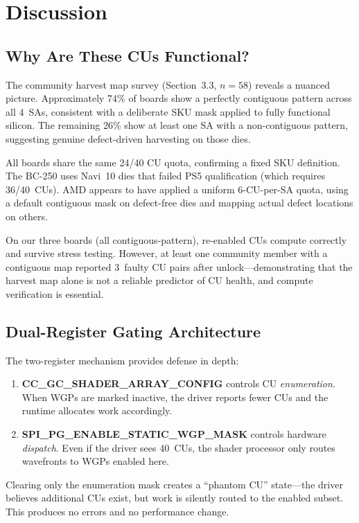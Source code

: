 \documentclass[11pt,twocolumn]{article}
\begin{document}
\section{Discussion}

\subsection{Why Are These CUs Functional?}

The community harvest map survey (Section~3.3, $n=58$) reveals a nuanced picture. Approximately 74\% of boards show a perfectly contiguous pattern across all 4~SAs, consistent with a deliberate SKU mask applied to fully functional silicon. The remaining 26\% show at least one SA with a non-contiguous pattern, suggesting genuine defect-driven harvesting on those dies.

All boards share the same 24/40 CU quota, confirming a fixed SKU definition. The BC-250 uses Navi~10 dies that failed PS5 qualification (which requires 36/40~CUs). AMD appears to have applied a uniform 6-CU-per-SA quota, using a default contiguous mask on defect-free dies and mapping actual defect locations on others.

On our three boards (all contiguous-pattern), re-enabled CUs compute correctly and survive stress testing. However, at least one community member with a contiguous map reported 3~faulty CU pairs after unlock---demonstrating that the harvest map alone is not a reliable predictor of CU health, and compute verification is essential.

\subsection{Dual-Register Gating Architecture}

The two-register mechanism provides defense in depth:

\begin{enumerate}[nosep]
    \item \textbf{CC\_GC\_SHADER\_ARRAY\_CONFIG} controls CU \textit{enumeration}. When WGPs are marked inactive, the driver reports fewer CUs and the runtime allocates work accordingly.
    \item \textbf{SPI\_PG\_ENABLE\_STATIC\_WGP\_MASK} controls hardware \textit{dispatch}. Even if the driver sees 40~CUs, the shader processor only routes wavefronts to WGPs enabled here.
\end{enumerate}

Clearing only the enumeration mask creates a ``phantom CU'' state---the driver believes additional CUs exist, but work is silently routed to the enabled subset. This produces no errors and no performance change.
\end{document}
